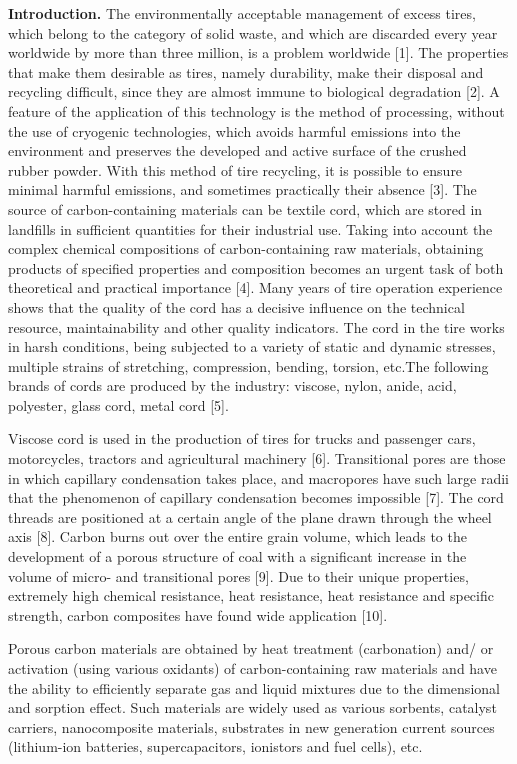 \begin{multicols}{2}
{\bfseries Introduction.} The environmentally acceptable management of
excess tires, which belong to the category of solid waste, and which are
discarded every year worldwide by more than three million, is a problem
worldwide {[}1{]}. The properties that make them desirable as tires,
namely durability, make their disposal and recycling difficult, since
they are almost immune to biological degradation {[}2{]}. A feature of
the application of this technology is the method of processing, without
the use of cryogenic technologies, which avoids harmful emissions into
the environment and preserves the developed and active surface of the
crushed rubber powder. With this method of tire recycling, it is
possible to ensure minimal harmful emissions, and sometimes practically
their absence {[}3{]}. The source of carbon-containing materials can be
textile cord, which are stored in landfills in sufficient quantities for
their industrial use. Taking into account the complex chemical
compositions of carbon-containing raw materials, obtaining products of
specified properties and composition becomes an urgent task of both
theoretical and practical importance {[}4{]}. Many years of tire
operation experience shows that the quality of the cord has a decisive
influence on the technical resource, maintainability and other quality
indicators. The cord in the tire works in harsh conditions, being
subjected to a variety of static and dynamic stresses, multiple strains
of stretching, compression, bending, torsion, etc.The following brands
of cords are produced by the industry: viscose, nylon, anide, acid,
polyester, glass cord, metal cord {[}5{]}.

Viscose cord is used in the production of tires for trucks and passenger
cars, motorcycles, tractors and agricultural machinery {[}6{]}.
Transitional pores are those in which capillary condensation takes
place, and macropores have such large radii that the phenomenon of
capillary condensation becomes impossible {[}7{]}. The cord threads are
positioned at a certain angle of the plane drawn through the wheel axis
{[}8{]}. Carbon burns out over the entire grain volume, which leads to
the development of a porous structure of coal with a significant
increase in the volume of micro- and transitional pores {[}9{]}. Due to
their unique properties, extremely high chemical resistance, heat
resistance, heat resistance and specific strength, carbon composites
have found wide application {[}10{]}.

Porous carbon materials are obtained by heat treatment (carbonation)
and/ or activation (using various oxidants) of carbon-containing raw
materials and have the ability to efficiently separate gas and liquid
mixtures due to the dimensional and sorption effect. Such materials are
widely used as various sorbents, catalyst carriers, nanocomposite
materials, substrates in new generation current sources (lithium-ion
batteries, supercapacitors, ionistors and fuel cells), etc.


\end{multicols}
